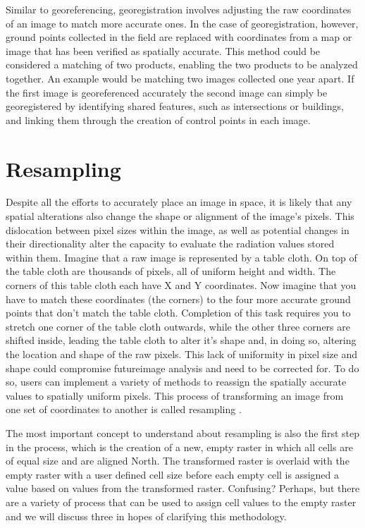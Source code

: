 \documentclass[
]{book}
\begin{document}
Similar to georeferencing, georegistration involves adjusting the raw coordinates of an image to match more accurate ones. In the case of georegistration, however, ground points collected in the field are replaced with coordinates from a map or image that has been verified as spatially accurate. This method could be considered a matching of two products, enabling the two products to be analyzed together. An example would be matching two images collected one year apart. If the first image is georeferenced accurately the second image can simply be georegistered by identifying shared features, such as intersections or buildings, and linking them through the creation of control points in each image.

\hypertarget{resampling}{%
\section{Resampling}\label{resampling}}

Despite all the efforts to accurately place an image in space, it is likely that any spatial alterations also change the shape or alignment of the image's pixels. This dislocation between pixel sizes within the image, as well as potential changes in their directionality alter the capacity to evaluate the radiation values stored within them. Imagine that a raw image is represented by a table cloth. On top of the table cloth are thousands of pixels, all of uniform height and width. The corners of this table cloth each have X and Y coordinates. Now imagine that you have to match these coordinates (the corners) to the four more accurate ground points that don't match the table cloth. Completion of this task requires you to stretch one corner of the table cloth outwards, while the other three corners are shifted inside, leading the table cloth to alter it's shape and, in doing so, altering the location and shape of the raw pixels. This lack of uniformity in pixel size and shape could compromise futureimage analysis and need to be corrected for. To do so, users can implement a variety of methods to reassign the spatially accurate values to spatially uniform pixels. This process of transforming an image from one set of coordinates to another is called resampling \citep{parker_comparison_1983}.

The most important concept to understand about resampling is also the first step in the process, which is the creation of a new, empty raster in which all cells are of equal size and are aligned North. The transformed raster is overlaid with the empty raster with a user defined cell size before each empty cell is assigned a value based on values from the transformed raster. Confusing? Perhaps, but there are a variety of process that can be used to assign cell values to the empty raster and we will discuss three in hopes of clarifying this methodology.
\end{document}
